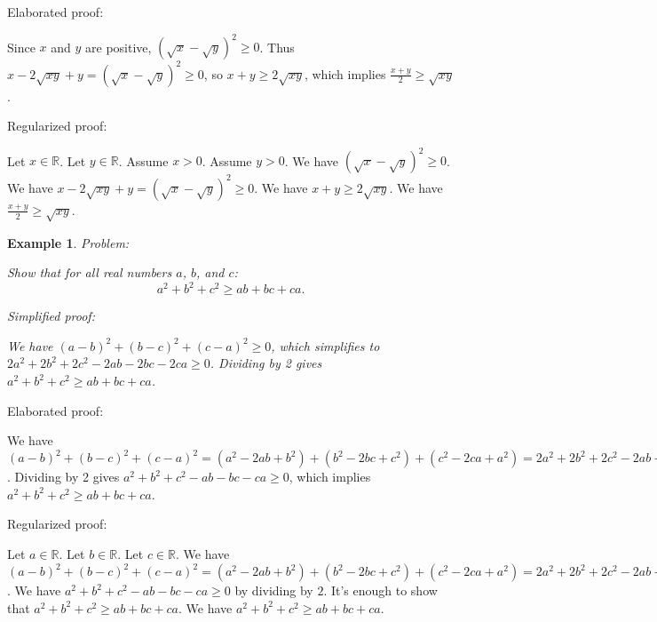 \documentclass{article}
\newtheorem{example}{Example}
\begin{document}
Elaborated proof:
\begin{tcolorbox}[colback=green!10, width=\linewidth]
Since $x$ and $y$ are positive, $(\sqrt{x} - \sqrt{y})^2 \ge 0$. Thus $x - 2\sqrt{xy} + y = (\sqrt{x} - \sqrt{y})^2 \ge 0$, so $x+y \ge 2\sqrt{xy}$, which implies $\frac{x+y}{2} \ge \sqrt{xy}$.
\end{tcolorbox}

Regularized proof:
\begin{tcolorbox}[colback=red!10, width=\linewidth]
Let $x\in\mathbb{R}$.
Let $y\in\mathbb{R}$.
Assume $x > 0$.
Assume $y > 0$.
We have $(\sqrt{x} - \sqrt{y})^2 \ge 0$.
We have $x - 2\sqrt{xy} + y = (\sqrt{x} - \sqrt{y})^2 \ge 0$.
We have $x+y \ge 2\sqrt{xy}$.
We have $\frac{x+y}{2} \ge \sqrt{xy}$.
\end{tcolorbox}



\begin{example}
Problem:
\begin{tcolorbox}[colback=yellow!10, width=\linewidth]
Show that for all real numbers $a$, $b$, and $c$:
    $$a^2 + b^2 + c^2 \geq ab + bc + ca.$$
\end{tcolorbox}

Simplified proof:
\begin{tcolorbox}[colback=blue!10, width=\linewidth]
We have $(a-b)^2 + (b-c)^2 + (c-a)^2 \geq 0$, which simplifies to $2a^2 + 2b^2 + 2c^2 - 2ab - 2bc - 2ca \geq 0$. Dividing by 2 gives $a^2 + b^2 + c^2 \geq ab + bc + ca$.
\end{tcolorbox}
\end{example}

Elaborated proof:
\begin{tcolorbox}[colback=green!10, width=\linewidth]
We have $(a-b)^2 + (b-c)^2 + (c-a)^2 = (a^2 - 2ab + b^2) + (b^2 - 2bc + c^2) + (c^2 - 2ca + a^2) = 2a^2 + 2b^2 + 2c^2 - 2ab - 2bc - 2ca \geq 0$. Dividing by 2 gives $a^2 + b^2 + c^2 - ab - bc - ca \geq 0$, which implies $a^2 + b^2 + c^2 \geq ab + bc + ca$.
\end{tcolorbox}

Regularized proof:
\begin{tcolorbox}[colback=red!10, width=\linewidth]
Let $a\in\mathbb{R}$.
Let $b\in\mathbb{R}$.
Let $c\in\mathbb{R}$.
We have $(a-b)^2 + (b-c)^2 + (c-a)^2 = (a^2 - 2ab + b^2) + (b^2 - 2bc + c^2) + (c^2 - 2ca + a^2) = 2a^2 + 2b^2 + 2c^2 - 2ab - 2bc - 2ca \geq 0$. We have $a^2 + b^2 + c^2 - ab - bc - ca \geq 0$ by dividing by $2$.  It's enough to show that $a^2 + b^2 + c^2 \geq ab + bc + ca$. We have $a^2 + b^2 + c^2 \geq ab + bc + ca$.
\end{tcolorbox}
\end{document}
